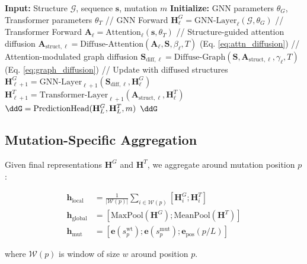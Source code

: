 \documentclass[12pt,en]{elegantpaper}
\begin{document}
\begin{algorithm}
\caption{Co-Learning via Bidirectional Diffusion}
\begin{algorithmic}[1]
\STATE \textbf{Input:} Structure $\mathcal{G}$, sequence $\mathbf{s}$, mutation $m$
\STATE \textbf{Initialize:} GNN parameters $\theta_G$, Transformer parameters $\theta_T$
    \STATE // GNN Forward
    \STATE $\mathbf{H}^G_\ell = \text{GNN-Layer}_\ell(\mathcal{G}, \theta_G)$
    \STATE // Transformer Forward  
    \STATE $\mathbf{A}_\ell = \text{Attention}_\ell(\mathbf{s}, \theta_T)$
    \STATE // Structure-guided attention diffusion
    \STATE $\mathbf{A}_{\text{struct}, \ell} = \text{Diffuse-Attention}(\mathbf{A}_\ell, \mathbf{S}, \beta_\ell, T)$ \quad (Eq. \ref{eq:attn_diffusion})
    \STATE // Attention-modulated graph diffusion
    \STATE $\mathbf{S}_{\text{diff}, \ell} = \text{Diffuse-Graph}(\mathbf{S}, \mathbf{A}_{\text{struct}, \ell}, \gamma_\ell, T)$ \quad (Eq. \ref{eq:graph_diffusion})
    \STATE // Update with diffused structures
    \STATE $\mathbf{H}^G_{\ell+1} = \text{GNN-Layer}_{\ell+1}(\mathbf{S}_{\text{diff}, \ell}, \mathbf{H}^G_\ell)$
    \STATE $\mathbf{H}^T_{\ell+1} = \text{Transformer-Layer}_{\ell+1}(\mathbf{A}_{\text{struct}, \ell}, \mathbf{H}^T_\ell)$
\ENDFOR
\STATE $\ddG = \text{PredictionHead}(\mathbf{H}^G_L, \mathbf{H}^T_L, m)$
\RETURN $\ddG$
\end{algorithmic}
\end{algorithm}

\subsection{Mutation-Specific Aggregation}

Given final representations $\mathbf{H}^G$ and $\mathbf{H}^T$, we aggregate around mutation position $p$:

\begin{align}
    \mathbf{h}_{\text{local}} &= \frac{1}{|\mathcal{W}(p)|} \sum_{i \in \mathcal{W}(p)} [\mathbf{H}^G_i; \mathbf{H}^T_i] \\
    \mathbf{h}_{\text{global}} &= [\text{MaxPool}(\mathbf{H}^G); \text{MeanPool}(\mathbf{H}^T)] \\
    \mathbf{h}_{\text{mut}} &= [\mathbf{e}(s_p^{\text{wt}}); \mathbf{e}(s_p^{\text{mut}}); \mathbf{e}_{\text{pos}}(p/L)]
\end{align}

where $\mathcal{W}(p)$ is window of size $w$ around position $p$.
\end{document}
